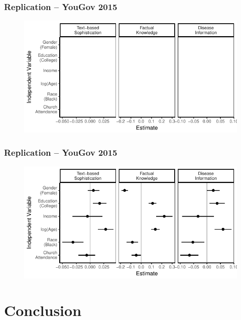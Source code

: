 \documentclass{beamer}
\begin{document}
\begin{frame} %
\frametitle{Replication -- YouGov 2015}
  \begin{figure}
  \includegraphics{../fig/yg_determinants_empty.pdf}
  \end{figure}
\end{frame}
\begin{frame} %
\frametitle{Replication -- YouGov 2015}
  \begin{figure}
  \includegraphics{../fig/yg_determinants_pres.pdf}
  \end{figure}
\end{frame}

\section{Conclusion}
\end{document}
